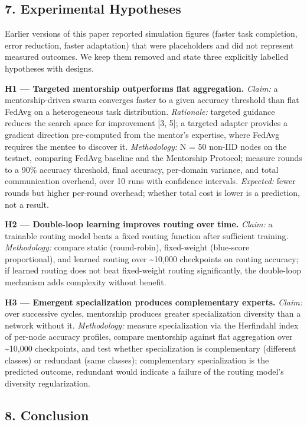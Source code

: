 \subsection{7. Experimental Hypotheses}\label{experimental-hypotheses}

Earlier versions of this paper reported simulation figures (faster task
completion, error reduction, faster adaptation) that were placeholders
and did not represent measured outcomes. We keep them removed and state
three explicitly labelled hypotheses with designs.

\textbf{H1 --- Targeted mentorship outperforms flat aggregation.}
\emph{Claim:} a mentorship-driven swarm converges faster to a given
accuracy threshold than flat FedAvg on a heterogeneous task
distribution. \emph{Rationale:} targeted guidance reduces the search
space for improvement {[}3, 5{]}; a targeted adapter provides a gradient
direction pre-computed from the mentor's expertise, where FedAvg
requires the mentee to discover it. \emph{Methodology:} N = 50 non-IID
nodes on the testnet, comparing FedAvg baseline and the Mentorship
Protocol; measure rounds to a 90\% accuracy threshold, final accuracy,
per-domain variance, and total communication overhead, over 10 runs with
confidence intervals. \emph{Expected:} fewer rounds but higher per-round
overhead; whether total cost is lower is a prediction, not a result.

\textbf{H2 --- Double-loop learning improves routing over time.}
\emph{Claim:} a trainable routing model beats a fixed routing function
after sufficient training. \emph{Methodology:} compare static
(round-robin), fixed-weight (blue-score proportional), and learned
routing over \textasciitilde10,000 checkpoints on routing accuracy; if
learned routing does not beat fixed-weight routing significantly, the
double-loop mechanism adds complexity without benefit.

\textbf{H3 --- Emergent specialization produces complementary experts.}
\emph{Claim:} over successive cycles, mentorship produces greater
specialization diversity than a network without it. \emph{Methodology:}
measure specialization via the Herfindahl index of per-node accuracy
profiles, compare mentorship against flat aggregation over
\textasciitilde10,000 checkpoints, and test whether specialization is
complementary (different classes) or redundant (same classes);
complementary specialization is the predicted outcome, redundant would
indicate a failure of the routing model's diversity regularization.

\subsection{8. Conclusion}\label{conclusion}

